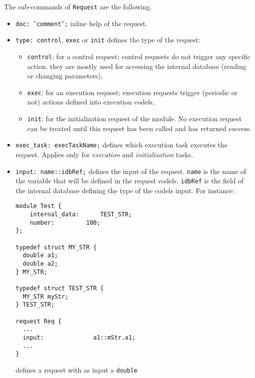 \noindent
The sub-commands of {\tt Request} are the following.\\

\begin{itemize}
\item[]{\tt doc: }''\texttt{comment}''{\tt;} inline help of the request.
\item[]{\tt type:  control}, {\tt exec} or {\tt init} defines the type of the request:
  \begin{itemize}
  \item {\tt control}: for a control request; control requests do not
    trigger any specific action. they are mostly used for accessing the
    internal database (reading or changing parameters),
  \item {\tt exec}: for an execution request; execution requests trigger
    (periodic or not) actions defined into execution codels,
  \item {\tt init}: for the initialization request of the module. No
    execution request can be treated until this request has been
    called and has returned success.
  \end{itemize}

\item[]{\tt exec\_task:  execTaskName;} defines which execution task
executes the request. Applies only for {\em execution} and {\em
  initialization} tasks.

\item[]\texttt{input: name::idbRef;} defines the input of the
  request. \texttt{name} is the name of the variable that will be
  defined in the request codels. \texttt{idbRef} is the field of the
  internal database defining the type of the codels input. For instance:\\
\begin{verbatim}
module Test {
    internal_data:	    TEST_STR;
    number:		    100;
}; 

typedef struct MY_STR {
  double a1;
  double a2;
} MY_STR;

typedef struct TEST_STR {
  MY_STR myStr;
} TEST_STR;

request Req {
  ...
  input:              a1::mStr.a1;
  ...
}
\end{verbatim}
defines a request with as input a {\tt double}\\


\end{itemize}
